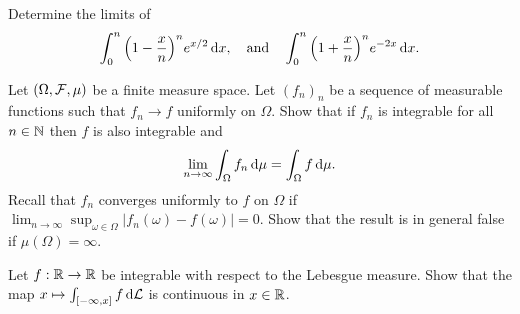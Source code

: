\begin{problem} Determine the limits of 
    \begin{equation*}
        \int_0^n \Big(1-\frac{x}{n}\Big)^n e^{x/2}\,\mathrm{d} x,\quad\text{and}\quad \int_0^n \Big(1+\frac{x}{n}\Big)^n e^{-2x}\,\mathrm{d} x.
    \end{equation*}
\end{problem}

\begin{problem} Let $(\Omega,\mathcal F,\mu)$ be a finite measure space. Let $(f_n)_n$ be a sequence of measurable functions such that $f_n\to f$ uniformly on $\Omega$. Show that if $f_n$ is integrable for all $n\in\mathbb N$ then $f$ is also integrable and
    \begin{equation*}
        \lim_{n\to\infty} \int_\Omega f_n \,\mathrm{d} \mu = \int_\Omega f \,\mathrm{d} \mu. 
    \end{equation*}
Recall that $f_n$ converges uniformly to $f$ on $\Omega$ if $\lim_{n\to\infty} \sup_{\omega\in \Omega} |f_n(\omega)-f(\omega)| = 0$.
Show that the result is in general false if $\mu(\Omega) = \infty$.
\end{problem}

\begin{problem}
    Let $f:\mathbb R\to \mathbb R$ be integrable with respect to the Lebesgue measure. Show that the map $x\mapsto \int_{[-\infty,x]} f\,\mathrm{d} \mathcal L$ is continuous in $x\in \mathbb R$.
\end{problem}

